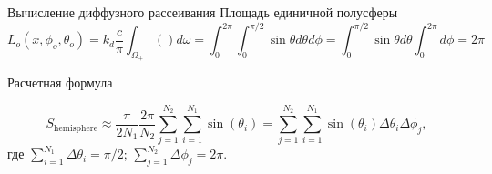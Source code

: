 \documentclass{beamer}
\begin{document}
	\begin{frame}{Вычисление диффузного рассеивания}
		Площадь единичной полусферы
		\[
			L_o(x,\phi_o,\theta_o) 
			= 
			k_d \frac{c}{\pi}
			\int_{\Omega_+} () d \omega 
			= 
			\int_{0}^{2\pi}\int_{0}^{\pi / 2} \sin \theta  d \theta d \phi
			= 
			\int_{0}^{\pi / 2} \sin \theta d \theta \int_{0}^{2\pi} d \phi
			=
			2 \pi
		\]

		Расчетная формула

		\[
			S_\text{hemisphere} 
			\approx
			\frac{\pi}{2 N_1}
			\frac{2 \pi}{N_2}
			\sum_{j=1}^{N_2} \sum_{i=1}^{N_1}
			\sin(\theta_i)
			=
			\sum_{j=1}^{N_2} \sum_{i=1}^{N_1}
			\sin(\theta_i) \Delta \theta_i \Delta \phi_j
			,
		\]
		где 
		$\sum_{i=1}^{N_1} \Delta \theta_i = \pi /2$;
		$\sum_{j=1}^{N_2} \Delta \phi_j = 2 \pi$.

	\end{frame}
\end{document}
